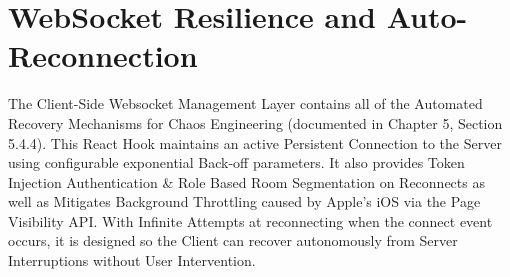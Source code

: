 \newpage
\section{WebSocket Resilience and Auto-Reconnection}
\label{sec:code_reconnection}

The Client-Side Websocket Management Layer contains all of the Automated Recovery Mechanisms for Chaos Engineering (documented in Chapter 5, Section 5.4.4). This React Hook maintains an active Persistent Connection to the Server using configurable exponential Back-off parameters. It also provides Token Injection Authentication \& Role Based Room Segmentation on Reconnects as well as Mitigates Background Throttling caused by Apple's iOS via the Page Visibility API. With Infinite Attempts at reconnecting when the connect event occurs, it is designed so the Client can recover autonomously from Server Interruptions without User Intervention.

